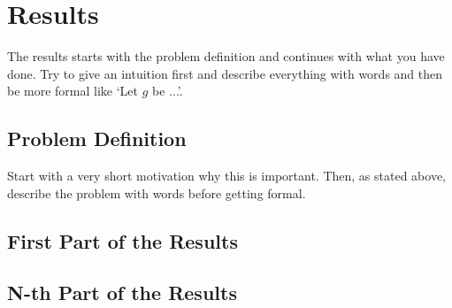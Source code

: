 \chapter{Results}\label{chap:results}
The results starts with the problem definition and continues with what you have done. Try to give an intuition first and describe everything with words and then be more formal like `Let $g$ be ...'.

\section{Problem Definition}
Start with a very short motivation why this is important. Then, as stated above, describe the problem with words before getting formal.

\section{First Part of the Results}

\section{N-th Part of the Results}